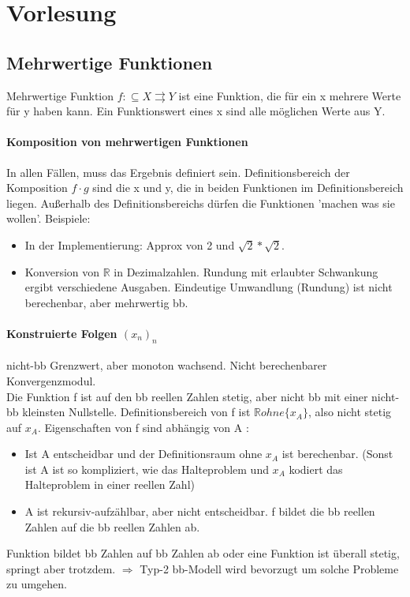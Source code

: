 \documentclass[ngerman]{scrartcl}
\begin{document}
\section{Vorlesung}
\subsection{Mehrwertige Funktionen}
Mehrwertige Funktion $ f: \subseteq X \rightrightarrows  Y $ ist eine Funktion, die für ein x mehrere Werte für y haben kann. Ein Funktionswert eines x sind alle möglichen Werte aus Y.

\paragraph{Komposition von mehrwertigen Funktionen} In allen Fällen, muss das Ergebnis definiert sein. Definitionsbereich  der Komposition $ f \cdot g $ sind die x und y, die in beiden Funktionen im Definitionsbereich liegen. Außerhalb des Definitionsbereichs dürfen die Funktionen 'machen was sie wollen'. Beispiele:
\begin{itemize}
  \item In der Implementierung: Approx von 2 und $ \sqrt{2} * \sqrt{2} $.
  \item Konversion von $ \mathbb{R} $ in Dezimalzahlen. Rundung mit erlaubter Schwankung ergibt verschiedene Ausgaben. Eindeutige Umwandlung (Rundung) ist nicht berechenbar, aber mehrwertig bb.
\end{itemize}

\paragraph{Konstruierte Folgen $ (x_n)_n $} nicht-bb Grenzwert, aber monoton wachsend. Nicht berechenbarer Konvergenzmodul. \\
Die Funktion f ist auf den bb reellen Zahlen stetig, aber nicht bb mit einer nicht-bb kleinsten Nullstelle. Definitionsbereich von f ist $ \mathbb{R} ohne \{x_A \} $, also nicht stetig auf $ x_A $. Eigenschaften von f sind abhängig von A :
\begin{itemize}
  \item Ist A entscheidbar und der Definitionsraum ohne $ x_A $ ist berechenbar. (Sonst ist A ist so kompliziert, wie das Halteproblem und $ x_A $ kodiert das Halteproblem in einer reellen Zahl)
  \item A ist rekursiv-aufzählbar, aber nicht entscheidbar. f bildet die bb reellen Zahlen auf die bb reellen Zahlen ab. 
\end{itemize}
Funktion bildet bb Zahlen auf bb Zahlen ab oder eine Funktion ist überall stetig, springt aber trotzdem. $ \Rightarrow $ Typ-2 bb-Modell wird bevorzugt um solche Probleme zu umgehen.   
\end{document}
